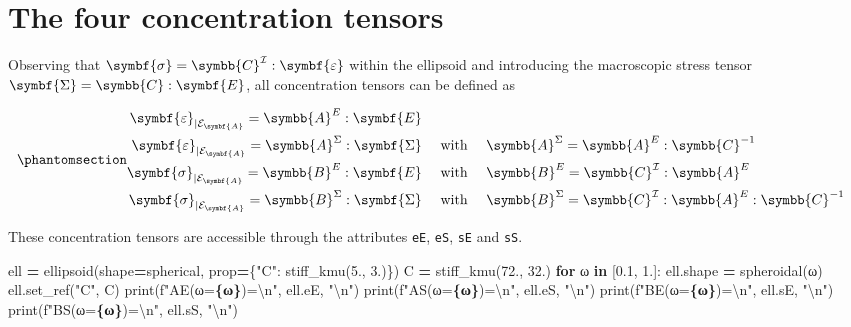 \documentclass[
  a4paper,
  numbers=noendperiod,
  DIV=12]{scrreprt}
\newenvironment{Shaded}{\begin{snugshade}}{\end{snugshade}}
\newcommand{\BuiltInTok}[1]{#1}
\newcommand{\CharTok}[1]{\textcolor[rgb]{0.31,0.60,0.02}{#1}}
\newcommand{\ControlFlowTok}[1]{\textcolor[rgb]{0.13,0.29,0.53}{\textbf{#1}}}
\newcommand{\FloatTok}[1]{\textcolor[rgb]{0.00,0.00,0.81}{#1}}
\newcommand{\KeywordTok}[1]{\textcolor[rgb]{0.13,0.29,0.53}{\textbf{#1}}}
\newcommand{\NormalTok}[1]{#1}
\newcommand{\OperatorTok}[1]{\textcolor[rgb]{0.81,0.36,0.00}{\textbf{#1}}}
\newcommand{\SpecialCharTok}[1]{\textcolor[rgb]{0.81,0.36,0.00}{\textbf{#1}}}
\newcommand{\SpecialStringTok}[1]{\textcolor[rgb]{0.31,0.60,0.02}{#1}}
\newcommand{\StringTok}[1]{\textcolor[rgb]{0.31,0.60,0.02}{#1}}
\newcommand{\uu}[1]{{\symbf{{#1}}}}
\newcommand{\uuuu}[1]{{\symbb{{#1}}}}
\newcommand{\eps}{{\uu{{\varepsilon}}}}
\newcommand{\E}{{\uu{{E}}}}
\newcommand{\sig}{{\uu{{\sigma}}}}
\newcommand{\Sig}{{\uu{{\Sigma}}}}
\begin{document}
\section{The four concentration tensors}\label{sec-four-concentration}

Observing that \(\sig=\uuuu{C}^\mathcal{I}:\eps\) within the ellipsoid
and introducing the macroscopic stress tensor \(\Sig=\uuuu{C}:\E\), all
concentration tensors can be defined as

\begin{equation}\protect\phantomsection\label{eq-ell-concentration2}{
\begin{aligned}
    \eps_{|\mathcal{E}_{\uu{A}}}=\uuuu{A}^E:\E&&\\
    \eps_{|\mathcal{E}_{\uu{A}}}=\uuuu{A}^\Sigma:\Sig&\quad\textrm{ with }\quad \uuuu{A}^\Sigma=\uuuu{A}^E:\uuuu{C}^{-1}&\\
    \sig_{|\mathcal{E}_{\uu{A}}}=\uuuu{B}^E:\E&\quad\textrm{ with }\quad \uuuu{B}^E=\uuuu{C}^\mathcal{I}:\uuuu{A}^E&\\
    \sig_{|\mathcal{E}_{\uu{A}}}=\uuuu{B}^\Sigma:\Sig&\quad\textrm{ with }\quad \uuuu{B}^\Sigma=\uuuu{C}^\mathcal{I}:\uuuu{A}^E:\uuuu{C}^{-1}&
\end{aligned}
}\end{equation}

These concentration tensors are accessible through the attributes
\texttt{eE}, \texttt{eS}, \texttt{sE} and \texttt{sS}.

\begin{Shaded}
\begin{Highlighting}[]
\NormalTok{ell }\OperatorTok{=}\NormalTok{ ellipsoid(shape}\OperatorTok{=}\NormalTok{spherical, prop}\OperatorTok{=}\NormalTok{\{}\StringTok{"C"}\NormalTok{: stiff\_kmu(}\FloatTok{5.}\NormalTok{, }\FloatTok{3.}\NormalTok{)\})}
\NormalTok{C }\OperatorTok{=}\NormalTok{ stiff\_kmu(}\FloatTok{72.}\NormalTok{, }\FloatTok{32.}\NormalTok{)}
\ControlFlowTok{for}\NormalTok{ ω }\KeywordTok{in}\NormalTok{ [}\FloatTok{0.1}\NormalTok{, }\FloatTok{1.}\NormalTok{]:}
\NormalTok{    ell.shape }\OperatorTok{=}\NormalTok{ spheroidal(ω)}
\NormalTok{    ell.set\_ref(}\StringTok{"C"}\NormalTok{, C)}
    \BuiltInTok{print}\NormalTok{(}\SpecialStringTok{f"AE(ω=}\SpecialCharTok{\{ω\}}\SpecialStringTok{)=}\CharTok{\textbackslash{}n}\SpecialStringTok{"}\NormalTok{, ell.eE, }\StringTok{"}\CharTok{\textbackslash{}n}\StringTok{"}\NormalTok{)}
    \BuiltInTok{print}\NormalTok{(}\SpecialStringTok{f"AS(ω=}\SpecialCharTok{\{ω\}}\SpecialStringTok{)=}\CharTok{\textbackslash{}n}\SpecialStringTok{"}\NormalTok{, ell.eS, }\StringTok{"}\CharTok{\textbackslash{}n}\StringTok{"}\NormalTok{)}
    \BuiltInTok{print}\NormalTok{(}\SpecialStringTok{f"BE(ω=}\SpecialCharTok{\{ω\}}\SpecialStringTok{)=}\CharTok{\textbackslash{}n}\SpecialStringTok{"}\NormalTok{, ell.sE, }\StringTok{"}\CharTok{\textbackslash{}n}\StringTok{"}\NormalTok{)}
    \BuiltInTok{print}\NormalTok{(}\SpecialStringTok{f"BS(ω=}\SpecialCharTok{\{ω\}}\SpecialStringTok{)=}\CharTok{\textbackslash{}n}\SpecialStringTok{"}\NormalTok{, ell.sS, }\StringTok{"}\CharTok{\textbackslash{}n}\StringTok{"}\NormalTok{)}
\end{Highlighting}
\end{Shaded}
\end{document}
